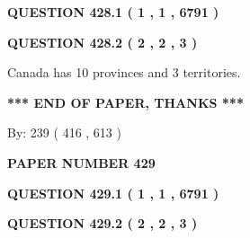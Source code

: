 \documentclass[12pt]{article}
\begin{document}
   
  
\vspace{0.2in}
  
{\textbf{\Large{QUESTION
428.1 
 ( 1 , 1 , 6791 )
}}}
  
  
  
\vspace{0.2in}
  
{\textbf{\Large{QUESTION
428.2 
 ( 2 , 2 , 3 )
}}}
  
  
 
 
\noindent{}
 
 
Canada has 10  provinces and 3 territories.
 
 
 
 
   
   
 \vspace{0.2in}
 
   
   
   
   
\vspace{1.0in} 
{\textbf{\large{ *** END OF PAPER, THANKS *** }}} 
   
   
\hspace{1.0in} By: 
 239 ( 416 ,  613 )
   
   
   
   
\newpage 
\setcounter{page}{ 
   429001 } 
   
   
   
   
 {\textbf{ \Large{ PAPER NUMBER  429  }}}
   
   
\vspace{0.2in}
   
   
   
   
   
   
 \vspace{0.2in}
 
 
 
 
   
   
  
\vspace{0.2in}
  
{\textbf{\Large{QUESTION
429.1 
 ( 1 , 1 , 6791 )
}}}
  
  
  
\vspace{0.2in}
  
{\textbf{\Large{QUESTION
429.2 
 ( 2 , 2 , 3 )
}}}
  
\end{document}
